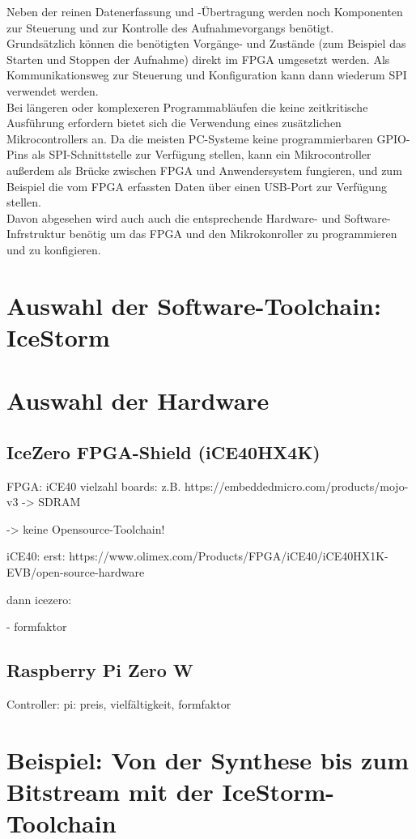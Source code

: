 Neben der reinen Datenerfassung und -Übertragung werden noch Komponenten zur Steuerung und zur Kontrolle des Aufnahmevorgangs benötigt.\\
Grundsätzlich können die benötigten Vorgänge- und Zustände (zum Beispiel das Starten und Stoppen der Aufnahme) direkt im FPGA umgesetzt werden. Als Kommunikationsweg zur Steuerung und Konfiguration kann dann wiederum SPI verwendet werden.\\
Bei längeren oder komplexeren Programmabläufen die keine zeitkritische Ausführung erfordern bietet sich die Verwendung eines zusätzlichen Mikrocontrollers an. Da die meisten PC-Systeme keine programmierbaren \acrshort{GPIO}-Pins als SPI-Schnittstelle zur Verfügung stellen, kann ein Mikrocontroller außerdem als Brücke zwischen FPGA und Anwendersystem fungieren, und zum Beispiel die vom FPGA erfassten Daten über einen USB-Port zur Verfügung stellen.\\
Davon abgesehen wird auch auch die entsprechende Hardware- und Software-Infrstruktur benötig um das FPGA und den Mikrokonroller zu programmieren und zu konfigieren.
\clearpage

\section{Auswahl der Software-Toolchain: IceStorm}
\clearpage

\section{Auswahl der Hardware}

\subsection{IceZero FPGA-Shield (iCE40HX4K)}
FPGA: iCE40
vielzahl boards:
	z.B. https://embeddedmicro.com/products/mojo-v3
	-> SDRAM

	-> keine Opensource-Toolchain!

iCE40:
	erst:
	https://www.olimex.com/Products/FPGA/iCE40/iCE40HX1K-EVB/open-source-hardware

	dann icezero:

	- formfaktor


\subsection{Raspberry Pi Zero W}

Controller:
	pi: preis, vielfältigkeit, formfaktor

\clearpage

\section{Beispiel: Von der Synthese bis zum Bitstream mit der IceStorm-Toolchain}
\clearpage


